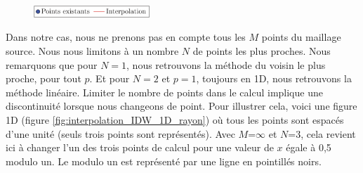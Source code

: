 \vspace{-0.5cm}

\begin{figure}[H]
    \centering
    \includegraphics[width=0.39\textwidth]{images/legende-interp3.png}
\end{figure}


Dans notre cas, nous ne prenons pas en compte tous les \(M\) points du maillage source. Nous nous limitons à un nombre \(N\) de points les plus proches. 
Nous remarquons que pour \( N = 1 \), nous retrouvons la méthode du voisin le plus proche, pour tout \( p \).
Et pour \( N = 2 \) et \( p = 1 \), toujours en 1D, nous retrouvons la méthode linéaire.
Limiter le nombre de points dans le calcul implique une discontinuité lorsque nous changeons de point. Pour illustrer cela, voici une figure 1D (figure \ref{fig:interpolation_IDW_1D_rayon}) où tous les points sont espacés d'une unité (seuls trois points sont représentés). Avec \(M\)=\(\infty\) et \(N\)=3, cela revient ici à changer l'un des trois points de calcul pour une valeur de \(x\) égale à 0,5 modulo un. Le modulo un est représenté par une ligne en pointillés noirs. %


